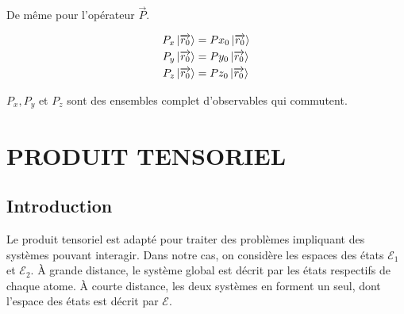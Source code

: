 \documentclass[12pt,a4paper,titlepage]{book}
\begin{document}
De même pour l'opérateur $\overrightarrow{P}$.

\begin{align*}
P_x \ket{\overrightarrow{r_0}} &= Px_0 \ket{\overrightarrow{r_0}}\\
P_y \ket{\overrightarrow{r_0}} &= Py_0 \ket{\overrightarrow{r_0}}\\
P_z \ket{\overrightarrow{r_0}} &= Pz_0 \ket{\overrightarrow{r_0}}
\end{align*}

$P_x , P_y$ et $P_z$ sont des ensembles complet d'observables qui commutent.

\chapter{PRODUIT TENSORIEL}

\section{Introduction}

Le produit tensoriel est adapté pour traiter des problèmes impliquant des systèmes pouvant interagir. Dans notre cas, on considère les espaces des états $\mathcal{E}_1$ et $\mathcal{E}_2$. À grande distance, le système global est décrit par les états respectifs de chaque atome. À courte distance, les deux systèmes en forment un seul, dont l'espace des états est décrit par $\mathcal{E}$. \\
\end{document}
